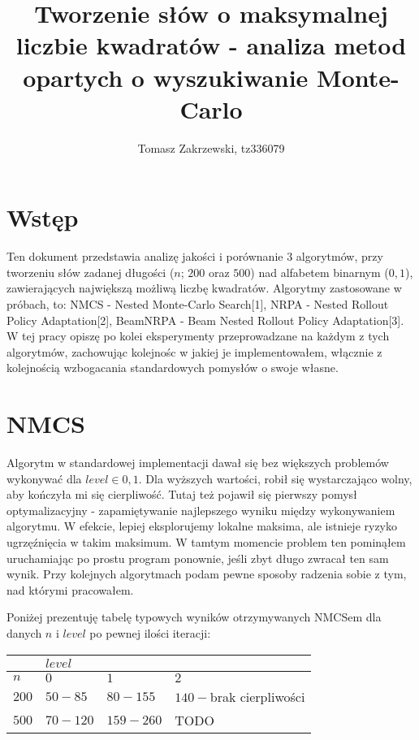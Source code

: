 \documentclass[a4paper,10pt]{article}
\title{Tworzenie słów o maksymalnej liczbie kwadratów - analiza metod opartych o wyszukiwanie Monte-Carlo}
\author{Tomasz Zakrzewski, tz336079}
\begin{document}
\maketitle

\section{Wstęp}
Ten dokument przedstawia analizę jakości i porównanie 3 algorytmów, przy tworzeniu słów zadanej długości ($n$; $200$ oraz $500$) 
nad alfabetem binarnym (${0, 1}$), zawierających największą możliwą liczbę kwadratów. Algorytmy zastosowane w próbach, to: NMCS
- Nested Monte-Carlo Search[1], NRPA - Nested Rollout Policy Adaptation[2], BeamNRPA - Beam Nested Rollout Policy Adaptation[3].
W tej pracy opiszę po kolei eksperymenty przeprowadzane na każdym z tych algorytmów, zachowując kolejnośc w jakiej je implementowałem,
włącznie z kolejnością wzbogacania standardowych pomysłów o swoje własne.

\section{NMCS}
Algorytm w standardowej implementacji dawał się bez większych problemów wykonywać dla $level \in {0, 1}$. Dla wyższych wartości, robił
się wystarczająco wolny, aby kończyła mi się cierpliwość. Tutaj też pojawił się pierwszy pomysł optymalizacyjny - zapamiętywanie najlepszego
wyniku między wykonywaniem algorytmu. W efekcie, lepiej eksplorujemy lokalne maksima, ale istnieje ryzyko ugrzęźnięcia w takim maksimum. 
W tamtym momencie problem ten pominąłem uruchamiając po prostu program ponownie, jeśli zbyt długo zwracał ten sam wynik. Przy kolejnych
algorytmach podam pewne sposoby radzenia sobie z tym, nad którymi pracowałem.

Poniżej prezentuję tabelę typowych wyników otrzymywanych NMCSem dla danych $n$ i $level$ po pewnej ilości iteracji: \\
\begin{adjustbox}{center}
\begin{tabularx}{0.7\linewidth}{|X|X|X|X| }
  \hline
  & \multicolumn{3}{|X|}{$level$} \\
  \hline
  $n$ & $0$ & $1$ & $2$ \\
  \hline
  $200$ & $50 - 85$ & $80 - 155$ & $140-$brak cierpliwości \\
  \hline
  $500$ & $70 - 120$ & $159 - 260$ & TODO \\
  \hline
\end{tabularx}
\end{adjustbox}
\end{document}
